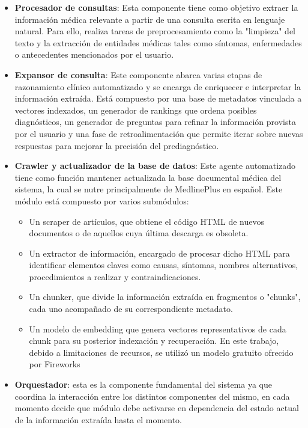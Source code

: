 \documentclass{llncs}
\begin{document}
\begin{itemize}
  \item \textbf{Procesador de consultas}: Esta componente tiene como objetivo extraer la información médica relevante a partir de una consulta escrita en lenguaje natural. Para ello, realiza tareas de preprocesamiento como la "limpieza" del texto y la
  extracción de entidades médicas tales como síntomas, enfermedades o antecedentes mencionados por el usuario.
  \item \textbf{Expansor de consulta}: Este componente abarca varias etapas de razonamiento clínico automatizado y se encarga de enriquecer e interpretar la información extraída. Está compuesto por una base de metadatos vinculada a vectores indexados, un
  generador de rankings que ordena posibles diagnósticos, un generador de preguntas para refinar la información provista por el usuario y una fase de retroalimentación que permite iterar sobre nuevas respuestas para mejorar la precisión del prediagnóstico.
  \item \textbf{Crawler y actualizador de la base de datos}: Este agente automatizado tiene como función mantener actualizada la base documental médica del sistema, la cual se nutre principalmente de MedlinePlus\cite{medlineplus} en español. Este módulo está compuesto
  por varios submódulos:
  \begin{itemize}
    \item Un scraper de artículos, que obtiene el código HTML de nuevos documentos o de aquellos cuya última descarga es obsoleta.
    \item Un extractor de información, encargado de procesar dicho HTML para identificar elementos claves como causas, síntomas, nombres alternativos, procedimientos a realizar y contraindicaciones.
    \item Un chunker, que divide la información extraída en fragmentos o "chunks", cada uno acompañado de su correspondiente metadato.
    \item Un modelo de embedding que genera vectores representativos de cada chunk para su posterior indexación y recuperación. En este trabajo, debido a limitaciones de recursos, se utilizó un modelo gratuito ofrecido por Fireworks\cite{fireworks_ai}
  \end{itemize}
  \item \textbf{Orquestador}: esta es la componente fundamental del sistema ya que coordina la interacción entre los distintos componentes del mismo, en cada momento decide que módulo debe activarse en dependencia del estado actual de la información extraída hasta el momento.
\end{itemize}
\end{document}
